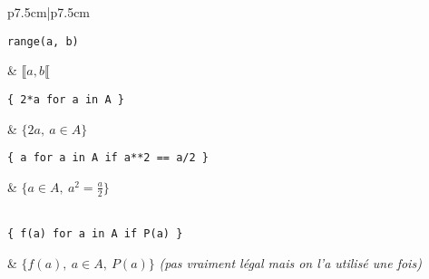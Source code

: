 \documentclass{article}
\begin{document}
\begin{table}[h]
	\centering
	\begin{tabular}{p{7.5cm}|p{7.5cm}}
\begin{minipage}{0.5\linewidth}
\begin{verbatim}
range(a, b)
\end{verbatim}
\end{minipage}
       & $\llbracket a, b \llbracket$ \\

\begin{minipage}{0.5\linewidth}
\begin{verbatim}
{ 2*a for a in A }
\end{verbatim}
\end{minipage}
       & $ \{2a,\ a \in A\}$ \\
\begin{minipage}{0.5\linewidth}
\begin{verbatim}
{ a for a in A if a**2 == a/2 }
\end{verbatim}
\end{minipage}
       & $ \{a \in A,\ a^2 = \frac{a}{2}\}$ \\
 \\

\begin{minipage}{0.5\linewidth}
\begin{verbatim}
{ f(a) for a in A if P(a) }
\end{verbatim}
\end{minipage}
       & $ \{f(a),\ a \in A,\ P(a)\}$ \emph{(pas vraiment légal mais on l'a utilisé une fois)}  \\
\end{tabular}
\end{table}
\end{document}
